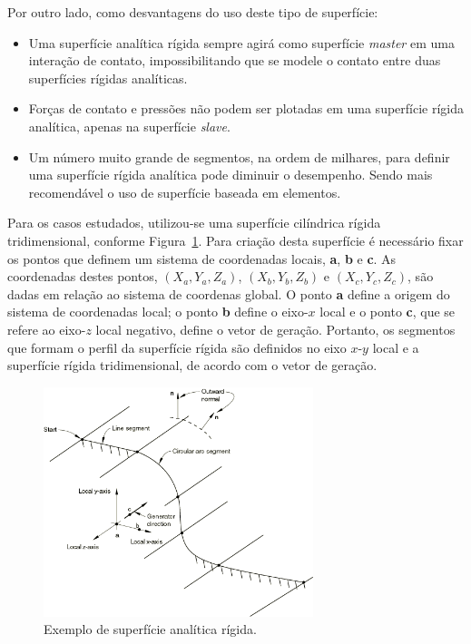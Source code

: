 Por outro lado, como desvantagens do uso deste tipo de superfície:
\begin{itemize}
    \item Uma superfície analítica rígida sempre agirá como superfície \textit{master} em uma interação de contato, impossibilitando que se modele o contato entre duas superfícies rígidas analíticas.
    \item Forças de contato e pressões não podem ser plotadas em uma superfície rígida analítica, apenas na superfície \textit{slave}.
    \item Um número muito grande de segmentos, na ordem de milhares, para definir uma superfície rígida analítica pode diminuir o desempenho. Sendo mais recomendável o uso de superfície baseada em elementos.
\end{itemize}


Para os casos estudados, utilizou-se uma superfície cilíndrica rígida tridimensional, conforme Figura~\ref{fig:superficie_analitica}. Para criação desta superfície é necessário fixar os pontos que definem um sistema de coordenadas locais, \textbf{a}, \textbf{b} e \textbf{c}. As coordenadas destes pontos, $(X_a, Y_a, Z_a)$, $(X_b, Y_b, Z_b)$ e $(X_c, Y_c, Z_c)$, são dadas em relação ao sistema de coordenas global. O ponto \textbf{a} define a origem do sistema de coordenadas local; o ponto \textbf{b} define o eixo-$x$ local e o ponto \textbf{c}, que se refere ao eixo-$z$ local negativo, define o vetor de geração.  Portanto, os segmentos que formam o perfil da superfície rígida são definidos no eixo $x$-$y$ local e a superfície rígida tridimensional, de acordo com o vetor de geração.

\begin{figure}[!ht]
    \centering
    \caption{Exemplo de superfície analítica rígida.}\label{fig:superficie_analitica} 
    \includegraphics[width=0.7\textwidth]{imagens/superficie_analitica}
\end{figure}
